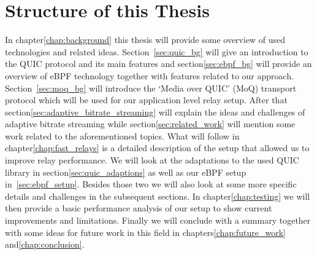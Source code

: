 \section{Structure of this Thesis}\label{sec:structure_of_thesis}

In chapter\nobreakspace\ref{chap:background} this thesis will provide some overview of used technologies
and related ideas.
Section~\ref{sec:quic_bg} will give an introduction to the QUIC protocol and its main features and 
section\nobreakspace\ref{sec:ebpf_bg} will provide an overview of eBPF technology together with features related to 
our approach.
Section~\ref{sec:moq_bg} will introduce the `Media over QUIC' (MoQ) transport protocol which will be used 
for our application level relay setup.
After that section\nobreakspace\ref{sec:adaptive_bitrate_streaming} will explain the ideas and challenges of 
adaptive bitrate streaming while section\nobreakspace\ref{sec:related_work} will mention some work related to 
the aforementioned topics.
What will follow in chapter\nobreakspace\ref{chap:fast_relays} is a detailed description of the setup that 
allowed us to improve relay performance. 
We will look at the adaptations to the used QUIC library in section\nobreakspace\ref{sec:quic_adaptions} as well as 
our eBPF setup in~\ref{sec:ebpf_setup}. Besides those two we will also look at some more specific details and 
challenges in the subsequent sections.
In chapter\nobreakspace\ref{chap:testing} we will then provide a basic performance analysis of our setup to show current improvements and limitations.
Finally we will conclude with a summary together with some ideas for future work in this field in chapters\nobreakspace\ref{chap:future_work} 
and\nobreakspace\ref{chap:conclusion}.